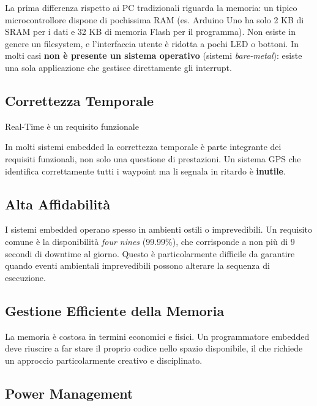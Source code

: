 \documentclass[
  italian,
  openany]{book}
\begin{document}
La prima differenza rispetto ai PC tradizionali riguarda la memoria: un
tipico microcontrollore dispone di pochissima RAM (es. Arduino Uno ha
solo 2 KB di SRAM per i dati e 32 KB di memoria Flash per il programma).
Non esiste in genere un filesystem, e l'interfaccia utente è ridotta a
pochi LED o bottoni. In molti casi \textbf{non è presente un sistema
operativo} (sistemi \emph{bare-metal}): esiste una sola applicazione che
gestisce direttamente gli interrupt.

\subsection{Correttezza Temporale}\label{correttezza-temporale}

\begin{calloutwarning}{Real-Time è un requisito funzionale}

In molti sistemi embedded la correttezza temporale è parte integrante
dei requisiti funzionali, non solo una questione di prestazioni. Un
sistema GPS che identifica correttamente tutti i waypoint ma li segnala
in ritardo è \textbf{inutile}.

\end{calloutwarning}

\subsection{Alta Affidabilità}\label{alta-affidabilituxe0}

I sistemi embedded operano spesso in ambienti ostili o imprevedibili. Un
requisito comune è la disponibilità \emph{four nines} (99.99\%), che
corrisponde a non più di 9 secondi di downtime al giorno. Questo è
particolarmente difficile da garantire quando eventi ambientali
imprevedibili possono alterare la sequenza di esecuzione.

\subsection{Gestione Efficiente della
Memoria}\label{gestione-efficiente-della-memoria}

La memoria è costosa in termini economici e fisici. Un programmatore
embedded deve riuscire a far stare il proprio codice nello spazio
disponibile, il che richiede un approccio particolarmente creativo e
disciplinato.

\subsection{Power Management}\label{power-management}
\end{document}
